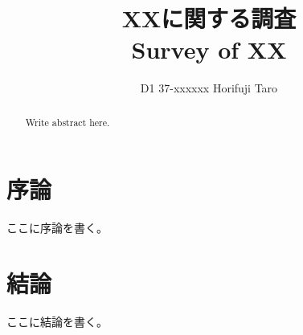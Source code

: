\documentclass[10pt,a4paper,oneside,twocolumn,fleqn,dvipdfmx]{jarticle}
\title{XXに関する調査\\ Survey of XX}
\author{D1 37-xxxxxx Horifuji Taro}
\begin{document}

\begin{abstract}
    Write abstract here.
\end{abstract}

\maketitle

\section{序論}
ここに序論を書く。

\section{結論}
ここに結論を書く。

\small
%
%
\normalsize
\end{document}
